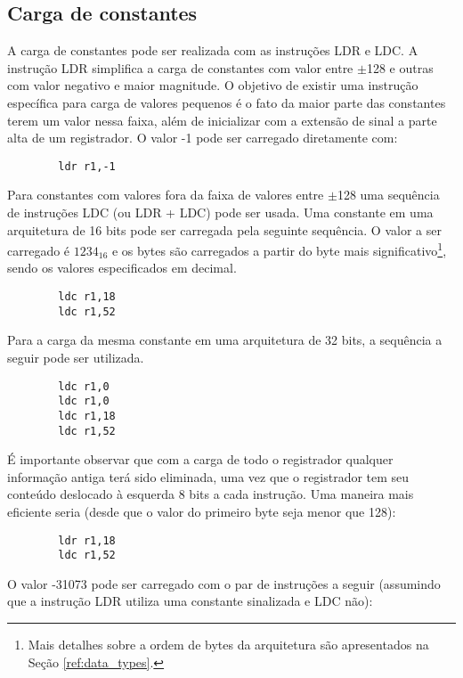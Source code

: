 \documentclass{extreport}
\begin{document}
\subsection{Carga de constantes}
\label{ref:constants}
A carga de constantes pode ser realizada com as instruções LDR e LDC. A instrução LDR simplifica a carga de constantes com valor entre $\pm$128 e outras com valor negativo e maior magnitude. O objetivo de existir uma instrução específica para carga de valores pequenos é o fato da maior parte das constantes terem um valor nessa faixa, além de inicializar com a extensão de sinal a parte alta de um registrador. O valor -1 pode ser carregado diretamente com:

\begin{verbatim}
        ldr r1,-1
\end{verbatim}

Para constantes com valores fora da faixa de valores entre $\pm$128 uma sequência de instruções LDC (ou LDR + LDC) pode ser usada. Uma constante em uma arquitetura de 16 bits pode ser carregada pela seguinte sequência. O valor a ser carregado é $1234_{16}$ e os bytes são carregados a partir do byte mais significativo\footnote{Mais detalhes sobre a ordem de bytes da arquitetura são apresentados na Seção \ref{ref:data_types}.}, sendo os valores especificados em decimal.

\begin{verbatim}
        ldc r1,18
        ldc r1,52
\end{verbatim}

Para a carga da mesma constante em uma arquitetura de 32 bits, a sequência a seguir pode ser utilizada.

\begin{verbatim}
        ldc r1,0
        ldc r1,0
        ldc r1,18
        ldc r1,52
\end{verbatim}

É importante observar que com a carga de todo o registrador qualquer informação antiga terá sido eliminada, uma vez que o registrador tem seu conteúdo deslocado à esquerda 8 bits a cada instrução. Uma maneira mais eficiente seria (desde que o valor do primeiro byte seja menor que 128):

\begin{verbatim}
        ldr r1,18
        ldc r1,52
\end{verbatim}

O valor -31073 pode ser carregado com o par de instruções a seguir (assumindo que a instrução LDR utiliza uma constante sinalizada e LDC não):
\end{document}
